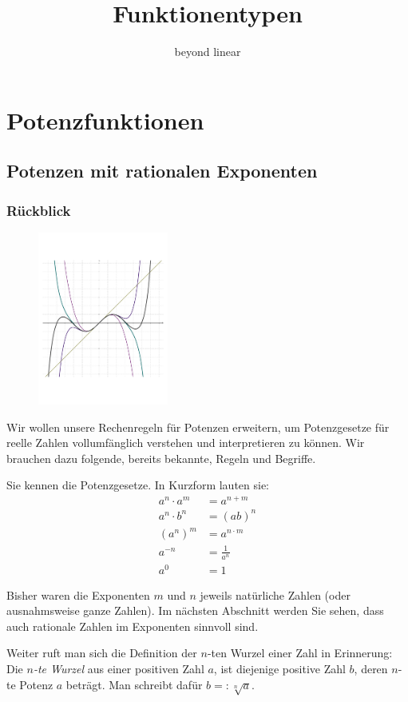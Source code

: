 \documentclass[%
11pt,%
twoside,%
titlepage,%
german,%
headsepline%
]{scrartcl}
\title{Funktionentypen}
\subtitle{beyond linear}
\author{}
\date{}
\begin{document}
\maketitle
\tableofcontents
\cleardoublepage

\clearpage
 
\section{Potenzfunktionen}
  
\subsection{Potenzen mit rationalen Exponenten}
\subsubsection{Rückblick}
  \begin{figure}
  \begin{center}
    \includegraphics[width=0.382\textwidth]{pictures/title}
  \end{center}
\end{figure}
Wir wollen unsere Rechenregeln für Potenzen erweitern, um Potenzgesetze
für reelle Zahlen vollumfänglich verstehen und interpretieren zu können.
Wir brauchen dazu folgende, bereits bekannte, Regeln und Begriffe.
\begin{erin}
  Sie
  kennen die Potenzgesetze. In Kurzform lauten sie:
\begin{align}
  a^n\cdot a^m&=a^{n+m}\\
  a^n\cdot b^n&=(ab)^n\\
  \left(a^n\right)^m&=a^{n\cdot m}\\
  a^{-n}&=\frac{1}{a^n}\\
  a^0&=1
\end{align}

Bisher waren die Exponenten $m$ und $n$ jeweils natürliche Zahlen (oder ausnahmsweise ganze Zahlen). Im
nächsten Abschnitt werden Sie sehen, dass auch rationale Zahlen im Exponenten sinnvoll sind.

Weiter ruft man sich die Definition der $n$-ten Wurzel einer Zahl
in Erinnerung: Die \emph{$n$-te Wurzel} aus einer positiven Zahl
$a$, ist diejenige positive Zahl $b$, deren $n$-te Potenz $a$ beträgt.
Man schreibt dafür $b=:\sqrt[n]{a}$.
\end{erin}
\end{document}
